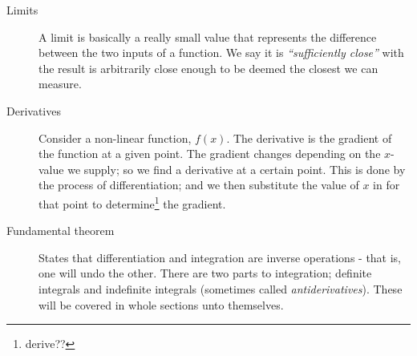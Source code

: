 \begin{description}
  \item[Limits] A limit is basically a really small value that represents the
  difference between the two inputs of a function. We say it is
  \emph{``sufficiently close''} with the result is arbitrarily close enough to
  be deemed the closest we can measure.
  
  \item[Derivatives] Consider a non-linear function, $f(x)$. The derivative is
  the gradient of the function at a given point. The gradient changes depending
  on the $x$-value we supply; so we find a derivative at a certain point. This
  is done by the process of differentiation; and we then substitute the value of
  $x$ in for that point to determine\footnote{derive??} the gradient.
  
  \item[Fundamental theorem] States that differentiation and integration are
  inverse operations - that is, one will undo the other. There are two parts to
  integration; definite integrals and indefinite integrals (sometimes called
  \emph{antiderivatives}). These will be covered in whole sections unto
  themselves.
\end{description}
